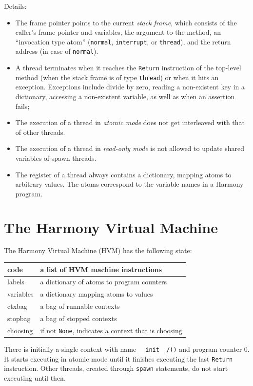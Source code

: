 \documentclass{report}
\begin{document}
Details:
\begin{itemize}
\item The frame pointer points to the current \emph{stack frame},
which consists of the caller's frame pointer and variables, the argument to
the method, an ``invocation type atom'' (\texttt{normal}, \texttt{interrupt}, or
\texttt{thread}), and the return address (in case of \texttt{normal}).
\item A thread terminates when it reaches the \texttt{Return} instruction
of the top-level method (when the stack frame is of type \texttt{thread})
or when it hits an exception.  Exceptions include divide by zero,
reading a non-existent key in a dictionary, accessing a non-existent
variable, as well as when an assertion fails;
\item The execution of a thread in \emph{atomic mode} does not get interleaved
with that of other threads.
\item The execution of a thread in \emph{read-only mode} is not allowed
to update shared variables of spawn threads.
\item The register of a thread always contains a dictionary, mapping
atoms to arbitrary values.  The atoms correspond to the variable names
in a Harmony program.
\end{itemize}

\chapter{The Harmony Virtual Machine}

The Harmony Virtual Machine (HVM) has the following state:

\vspace{1em}
\begin{tabular}{|l|l|}
\hline
code & a list of HVM machine instructions \\
\hline
labels & a dictionary of atoms to program counters \\
\hline
variables & a dictionary mapping atoms to values \\
\hline
ctxbag & a bag of runnable contexts \\
\hline
stopbag & a bag of stopped contexts \\
\hline
choosing & if not \texttt{None}, indicates a context that is choosing \\
\hline
\end{tabular}
\vspace{1em}

There is initially a single context with name
\texttt{\_\_init\_\_/()} and program counter 0.  It starts executing
in atomic mode until it finishes executing the last
\texttt{Return} instruction.
Other threads, created through \texttt{spawn} statements, do not
start executing until then.
\end{document}

